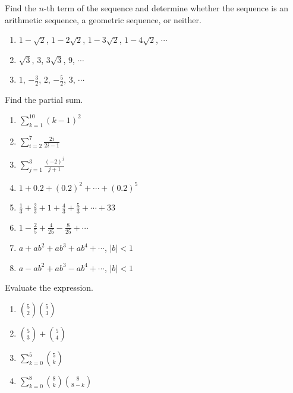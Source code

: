 \begin{exercise}
Find the $n$-th term of the sequence and determine whether the sequence is 
an arithmetic sequence, a geometric sequence, or neither. 
\begin{enumerate}[itemsep=0.5\baselineskip, after=\vspace*{0.5\baselineskip}]
    \item $1-\sqrt{2}$, $1-2\sqrt{2}$, $1-3\sqrt{2}$, $1-4\sqrt{2}$, $\cdots$
    \item $\sqrt{3}$, $3$, $3\sqrt{3}$, $9$, $\cdots$
    \item $1$, $-\frac{3}{2}$, $2$, $-\frac{5}{2}$, $3$, $\cdots$
\end{enumerate}
\end{exercise}

\begin{exercise}
    Find the partial sum.
    \begin{enumerate}[itemsep=0.5\baselineskip, after=\vspace*{0.5\baselineskip}]
        \item $\sum\limits_{k=1}^{10}(k-1)^2$
        \item $\sum\limits_{i=2}^{7}\frac{2i}{2i-1}$
        \item $\sum\limits_{j=1}^{3}\frac{(-2)^j}{j+1}$
        \item $1+0.2+(0.2)^2+\cdots+(0.2)^5$
        \item $\frac13+\frac23+1+\frac43+\frac53+\cdots+33$
        \item $1-\frac25+\frac{4}{25}-\frac{8}{25}+\cdots$
        \item $a+ab^2+ab^3+ab^4+\cdots$, $|b|<1$
        \item $a-ab^2+ab^3-ab^4+\cdots$, $|b|<1$
    \end{enumerate}
\end{exercise}

\begin{exercise}
    Evaluate the expression.
    \begin{enumerate}[itemsep=0.5\baselineskip, after=\vspace*{0.5\baselineskip}]
        \item $\binom{5}{2}\binom{5}{3}$
        \item $\binom{5}{3}+\binom{5}{4}$
        \item $\sum\limits_{k=0}^5\binom{5}{k}$
        \item $\sum\limits_{k=0}^8\binom{8}{k}\binom{8}{8-k}$
    \end{enumerate}
\end{exercise}

